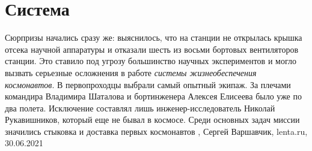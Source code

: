  
 
 
 
 
\chapter{Система}

Сюрпризы начались сразу же: выяснилось, что на станции не открылась крышка
отсека научной аппаратуры и отказали шесть из восьми бортовых вентиляторов
станции. Это ставило под угрозу большинство научных экспериментов и могло
вызвать серьезные осложнения в работе \emph{системы жизнеобеспечения
космонавтов}.  В первопроходцы выбрали самый опытный экипаж. За плечами
командира Владимира Шаталова и бортинженера Алексея Елисеева было уже по два
полета. Исключение составлял лишь инженер-исследователь Николай Рукавишников,
который еще не бывал в космосе. Среди основных задач миссии значились стыковка
и доставка первых космонавтов
, Сергей Варшавчик, lenta.ru, 30.06.2021

